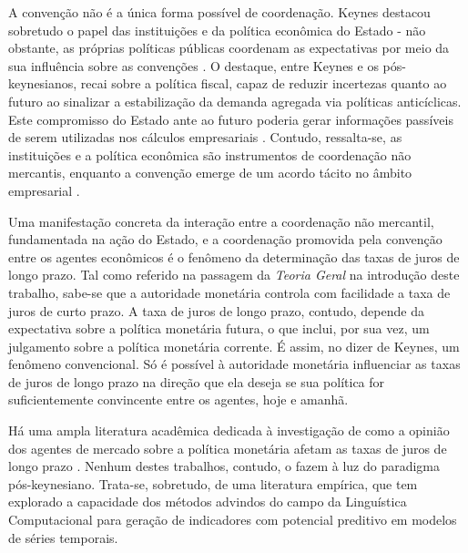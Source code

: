 A convenção não é a única forma possível de coordenação. Keynes destacou sobretudo o papel das instituições e da política econômica do Estado - não obstante, as próprias políticas públicas coordenam as expectativas por meio da sua influência sobre as convenções \parencite{resende_ciclo_2020}. O destaque, entre Keynes e os pós-keynesianos, recai sobre a política fiscal, capaz de reduzir incertezas quanto ao futuro ao sinalizar a estabilização da demanda agregada via políticas anticíclicas. Este compromisso do Estado ante ao futuro poderia gerar informações passíveis de serem utilizadas nos cálculos empresariais \textcite[p. 157]{carvalho_keynes_2020}. Contudo, ressalta-se, as instituições e a política econômica são instrumentos de coordenação não mercantis, enquanto a convenção emerge de um acordo tácito no âmbito empresarial \parencite[p. 162-164]{abramo_cidade_2007}.

Uma manifestação concreta da interação entre a coordenação não mercantil, fundamentada na ação do Estado, e a coordenação promovida pela convenção entre os agentes econômicos é o fenômeno da determinação das taxas de juros de longo prazo. Tal como referido na passagem da \textit{Teoria Geral} na introdução deste trabalho, sabe-se que a autoridade monetária controla com facilidade a taxa de juros de curto prazo. A taxa de juros de longo prazo, contudo, depende da expectativa sobre a política monetária futura, o que inclui, por sua vez, um julgamento sobre a política monetária corrente. É assim, no dizer de Keynes, um fenômeno convencional. Só é possível à autoridade monetária influenciar as taxas de juros de longo prazo na direção que ela deseja se sua política for suficientemente convincente entre os agentes, hoje e amanhã. 

Há uma ampla literatura acadêmica dedicada à investigação de como a opinião dos agentes de mercado sobre a política monetária afetam as taxas de juros de longo prazo \parencite{bloom_impact_2009, lucca_measuring_2009, haddow_macroeconomic_2013, baker_measuring_2016, nyman_news_2021}. Nenhum destes trabalhos, contudo, o fazem à luz do paradigma pós-keynesiano. Trata-se, sobretudo, de uma literatura empírica, que tem explorado a capacidade dos métodos advindos do campo da Linguística Computacional para geração de indicadores com potencial preditivo em modelos de séries temporais.  

